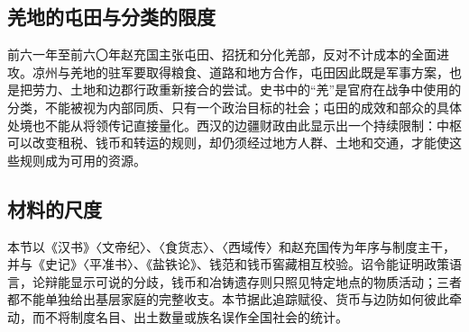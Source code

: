 \subsection{羌地的屯田与分类的限度}

前六一年至前六〇年赵充国主张屯田、招抚和分化羌部，反对不计成本的全面进攻。凉州与羌地的驻军要取得粮食、道路和地方合作，屯田因此既是军事方案，也是把劳力、土地和边郡行政重新接合的尝试。史书中的“羌”是官府在战争中使用的分类，不能被视为内部同质、只有一个政治目标的社会；屯田的成效和部众的具体处境也不能从将领传记直接量化。西汉的边疆财政由此显示出一个持续限制：中枢可以改变租税、钱币和转运的规则，却仍须经过地方人群、土地和交通，才能使这些规则成为可用的资源。

\subsection{材料的尺度}

本节以《汉书》〈文帝纪〉、〈食货志〉、〈西域传〉和赵充国传为年序与制度主干，并与《史记》〈平准书〉、《盐铁论》、钱范和钱币窖藏相互校验。诏令能证明政策语言，论辩能显示可说的分歧，钱币和冶铸遗存则只照见特定地点的物质活动；三者都不能单独给出基层家庭的完整收支。本节据此追踪赋役、货币与边防如何彼此牵动，而不将制度名目、出土数量或族名误作全国社会的统计。
